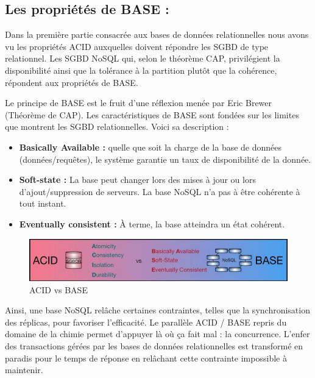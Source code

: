 \subsection{Les propriétés de BASE : }
Dans la première partie consacrée aux bases de données relationnelles nous avons vu les propriétés ACID auxquelles doivent répondre les SGBD de type relationnel. Les SGBD NoSQL qui, selon le théorème CAP, privilégient la disponibilité ainsi que la tolérance à la partition plutôt que la cohérence, répondent aux propriétés de BASE.

Le principe de BASE est le fruit d’une réflexion menée par Eric Brewer (Théorème de CAP). Les caractéristiques de BASE sont fondées sur les limites que montrent les SGBD relationnelles. Voici sa description :
\begin{itemize}[label=\textbullet]
\item \textbf{Basically Available :} quelle que soit la charge de la base de données (données/requêtes), le système garantie un taux de disponibilité de la donnée.
\item \textbf{Soft-state :} La base peut changer lors des mises à jour ou lors d'ajout/suppression de serveurs. La base NoSQL n'a pas à être cohérente à tout instant.
\item \textbf{Eventually consistent :} À terme, la base atteindra un état cohérent.
\end{itemize}

\begin{figure}[h]
	\centering
    \includegraphics[scale=0.5]{img/4.2}
    \caption{ACID vs BASE}
\end{figure}

Ainsi, une base NoSQL relâche certaines contraintes, telles que la synchronisation des réplicas, pour favoriser l'efficacité. Le parallèle ACID / BASE repris du domaine de la chimie permet d'appuyer là où ça fait mal : la concurrence. L'enfer des transactions gérées par les bases de données relationnelles est transformé en paradis pour le temps de réponse en relâchant cette contrainte impossible à maintenir.